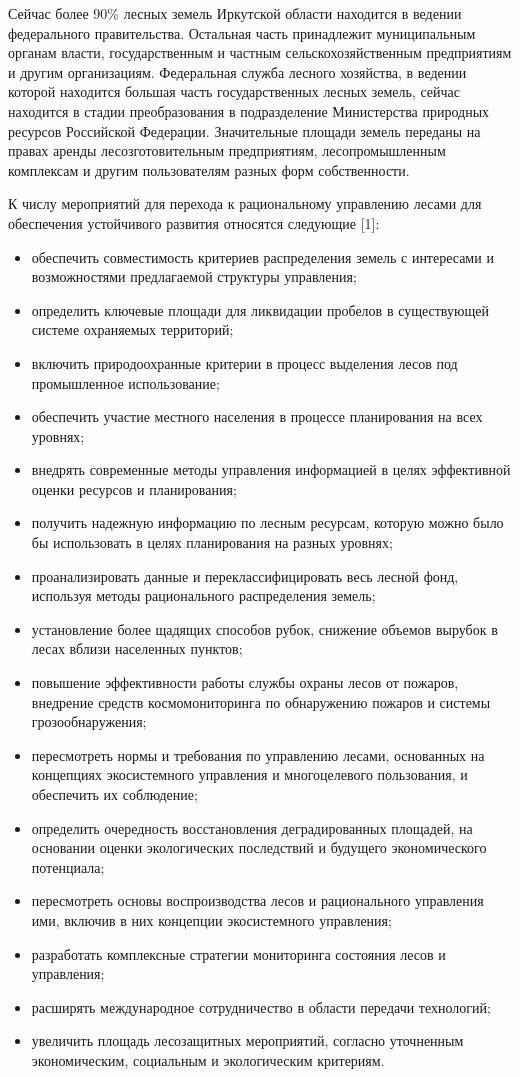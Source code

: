 \documentclass{report}
\begin{document}
Сейчас более 90\% лесных земель Иркутской области находится в ведении федерального правительства. Остальная часть
принадлежит муниципальным органам власти, государственным и частным сельскохозяйственным предприятиям и другим
организациям. Федеральная служба лесного хозяйства, в ведении которой находится большая часть государственных лесных
земель, сейчас находится в стадии преобразования в подразделение Министерства природных ресурсов Российской Федерации.
Значительные площади земель переданы на правах аренды лесозготовительным предприятиям, лесопромышленным комплексам  и
другим пользователям разных форм собственности. 

К числу мероприятий для перехода к рациональному управлению лесами для обеспечения устойчивого развития относятся
следующие [1]: 

\begin{itemize}
\item обеспечить совместимость критериев распределения земель с интересами и возможностями предлагаемой структуры
управления;
\item определить ключевые площади для ликвидации пробелов в существующей системе охраняемых территорий;
\item включить природоохранные критерии в процесс выделения лесов под промышленное использование;
\item обеспечить участие местного населения в процессе планирования на всех уровнях;
\item внедрять современные методы управления информацией в целях эффективной оценки ресурсов и планирования;
\item получить надежную информацию по лесным ресурсам, которую можно было бы использовать в целях планирования на разных
уровнях;
\item проанализировать данные и переклассифицировать весь лесной фонд, используя методы рационального распределения
земель;
\item установление более щадящих способов рубок, снижение объемов вырубок в лесах вблизи населенных пунктов;
\item повышение эффективности работы службы охраны лесов от пожаров, внедрение средств космомониторинга по обнаружению
пожаров и системы грозообнаружения;
\item пересмотреть нормы и требования по управлению лесами, основанных на концепциях экосистемного управления и
многоцелевого пользования, и обеспечить их соблюдение;
\item определить очередность восстановления деградированных площадей, на основании оценки экологических последствий и
будущего экономического потенциала;
\item пересмотреть основы воспроизводства лесов и рационального управления ими, включив в них концепции экосистемного
управления;
\item разработать комплексные стратегии мониторинга состояния лесов и управления;
\item расширять международное сотрудничество в области передачи технологий; 
\item увеличить площадь лесозащитных мероприятий, согласно уточненным экономическим, социальным и экологическим
критериям.
\end{itemize}
\end{document}

